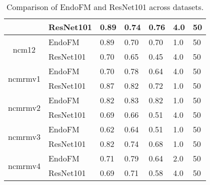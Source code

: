 \begin{table}[h]
\begin{tabular}{cllllll}
     & ResNet101 & 0.89 & 0.74 & 0.76 & 4.0 & 50 \\
    \midrule
    \multirow{2}{*}{ncm12}
 & EndoFM & 0.89 & 0.70 & 0.70 & 1.0 & 50 \\
     & ResNet101 & 0.70 & 0.65 & 0.45 & 4.0 & 50 \\
    \midrule
    \multirow{2}{*}{ncmrmv1}
 & EndoFM & 0.70 & 0.78 & 0.64 & 4.0 & 50 \\
     & ResNet101 & 0.87 & 0.82 & 0.72 & 1.0 & 50 \\
    \midrule
    \multirow{2}{*}{ncmrmv2}
 & EndoFM & 0.82 & 0.83 & 0.82 & 1.0 & 50 \\
     & ResNet101 & 0.69 & 0.66 & 0.51 & 4.0 & 50 \\
    \midrule
    \multirow{2}{*}{ncmrmv3}
 & EndoFM & 0.62 & 0.64 & 0.51 & 1.0 & 50 \\
     & ResNet101 & 0.82 & 0.74 & 0.68 & 1.0 & 50 \\
    \midrule
    \multirow{2}{*}{ncmrmv4}
 & EndoFM & 0.71 & 0.79 & 0.64 & 2.0 & 50 \\
     & ResNet101 & 0.69 & 0.71 & 0.58 & 4.0 & 50 \\
    \midrule
    \bottomrule
    \end{tabular}
    \vspace{-0.1in}
    \caption{Comparison of EndoFM and ResNet101 across datasets.}
    \label{tab:performance_comparison}
\end{table}
